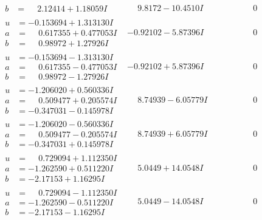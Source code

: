 \documentclass[1p]{elsarticle_modified}
\theoremstyle{definition}
\begin{document}
$$\begin{array}{c|c|c}
\begin{aligned}
b &= \phantom{-}2.12414 + 1.18059 I\end{aligned}
 & \phantom{-}9.8172 - 10.4510 I & \phantom{-0.000000 } 0 \\ \hline\begin{aligned}
u &= -0.153694 + 1.313130 I \\
a &= \phantom{-}0.617355 + 0.477053 I \\
b &= \phantom{-}0.98972 + 1.27926 I\end{aligned}
 & -0.92102 - 5.87396 I & \phantom{-0.000000 } 0 \\ \hline\begin{aligned}
u &= -0.153694 - 1.313130 I \\
a &= \phantom{-}0.617355 - 0.477053 I \\
b &= \phantom{-}0.98972 - 1.27926 I\end{aligned}
 & -0.92102 + 5.87396 I & \phantom{-0.000000 } 0 \\ \hline\begin{aligned}
u &= -1.206020 + 0.560336 I \\
a &= \phantom{-}0.509477 + 0.205574 I \\
b &= -0.347031 - 0.145978 I\end{aligned}
 & \phantom{-}8.74939 - 6.05779 I & \phantom{-0.000000 } 0 \\ \hline\begin{aligned}
u &= -1.206020 - 0.560336 I \\
a &= \phantom{-}0.509477 - 0.205574 I \\
b &= -0.347031 + 0.145978 I\end{aligned}
 & \phantom{-}8.74939 + 6.05779 I & \phantom{-0.000000 } 0 \\ \hline\begin{aligned}
u &= \phantom{-}0.729094 + 1.112350 I \\
a &= -1.262590 + 0.511220 I \\
b &= -2.17153 + 1.16295 I\end{aligned}
 & \phantom{-}5.0449 + 14.0548 I & \phantom{-0.000000 } 0 \\ \hline\begin{aligned}
u &= \phantom{-}0.729094 - 1.112350 I \\
a &= -1.262590 - 0.511220 I \\
b &= -2.17153 - 1.16295 I\end{aligned}
 & \phantom{-}5.0449 - 14.0548 I & \phantom{-0.000000 } 0 \\ \hline\begin{aligned}

\end{aligned}
\end{array}$$
\end{document}
